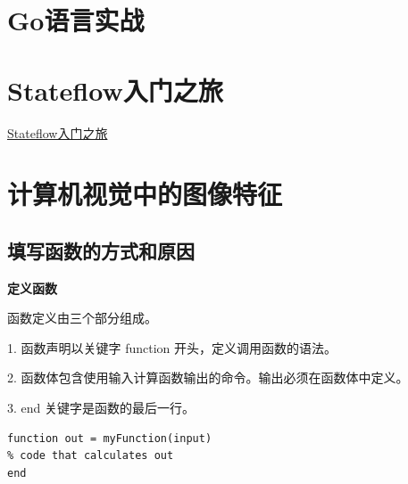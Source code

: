 \documentclass[12pt,a4paper]{article}
\begin{document}
\section{Go语言实战}

















\newpage
\section{Stateflow入门之旅}
\href{https://matlabacademy.mathworks.com/cn/details/stateflow-onramp/stateflow}{Stateflow入门之旅}








































\section{计算机视觉中的图像特征}
\subsection{填写函数的方式和原因}

\textbf{定义函数}

函数定义由三个部分组成。

1. 函数声明以关键字 function 开头，定义调用函数的语法。

2. 函数体包含使用输入计算函数输出的命令。输出必须在函数体中定义。

3. end 关键字是函数的最后一行。

\begin{lstlisting}
function out = myFunction(input)
% code that calculates out
end
\end{lstlisting}
\end{document}
